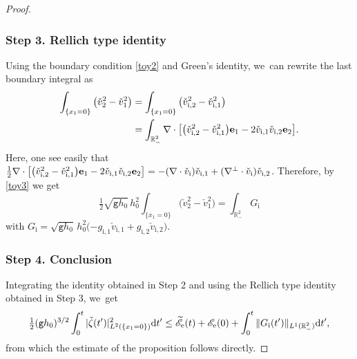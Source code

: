 \documentclass[10pt]{amsart}
\newcommand{\gr}{{\mathtt g}}
\newcommand{\R}{{\mathbb R}}
\theoremstyle{definition}
\begin{document}
\begin{proof}
\subsubsection*{Step 3. Rellich type identity}
Using the boundary condition \eqref{toy2} and Green's identity, we~can rewrite the last boundary integral as
\begin{align*}
\int_{\{x_1=0\}}\big(\check{v}_2^2- \check{v}_1^2\big)
&= \int_{\{x_1=0\}}\big(\check{v}_\mathrm{i,2}^2- \check{v}_\mathrm{i,1}^2\big)\\
&= \int_{\R^2_-}\nabla\cdot \big[\big(\check{v}_\mathrm{i,2}^2- \check{v}_\mathrm{i,1}^2\big) {\bf e}_1- 2 \check{v}_\mathrm{i,1}\check{v}_\mathrm{i,2}{\bf e}_2\big].
\end{align*}
Here, one see easily that
$\frac{1}{2}\nabla\cdot \big[\big(\check{v}_\mathrm{i,2}^2-\check{v}_\mathrm{i,1}^2\big) {\bf e}_1- 2 \check{v}_\mathrm{i,1}\check{v}_\mathrm{i,2}{\bf e}_2\big]
=-(\nabla\cdot \check{v}_\mathrm{i})\check{v}_\mathrm{i,1}+(\nabla^\perp \cdot \check{v}_\mathrm{i})\check{v}_\mathrm{i,2}$.
Therefore, by \eqref{toy3} we get
\[
\tfrac{1}{2}\sqrt{\gr h_0}\,h_0^2 \int_{\{x_1=0\}} \big(\check{v}_2^2-\check{v}_1^2\big)=\int_{\R^2_-}G_\mathrm{i}
\]
with $G_\mathrm{i}=\sqrt{\gr h_0}\,h_0^2 (-g_\mathrm{i,1}\check{v}_\mathrm{i,1}+g_\mathrm{i,2}\check{v}_\mathrm{i,2}\big)$.

\subsubsection*{Step 4. Conclusion}
Integrating the identity obtained in Step 2 and using the Rellich type identity obtained in Step 3, we~get
\[
\tfrac{1}{2}(\gr h_0)^{3/2}\int_0^t \vert \check{\zeta}(t')\vert^2_{L^2(\{x_1=0\})}{\rm d}t'
\leq \widetilde{\mathscr E}_\mathrm{e}(t) + {\mathscr E}_\mathrm{e}(0)+\int_0^t \Vert G_\mathrm{i}(t')\Vert_{L^1(\R^2_-)}{\rm d}t',
\]
from which the estimate of the proposition follows directly.
\end{proof}
\end{document}
